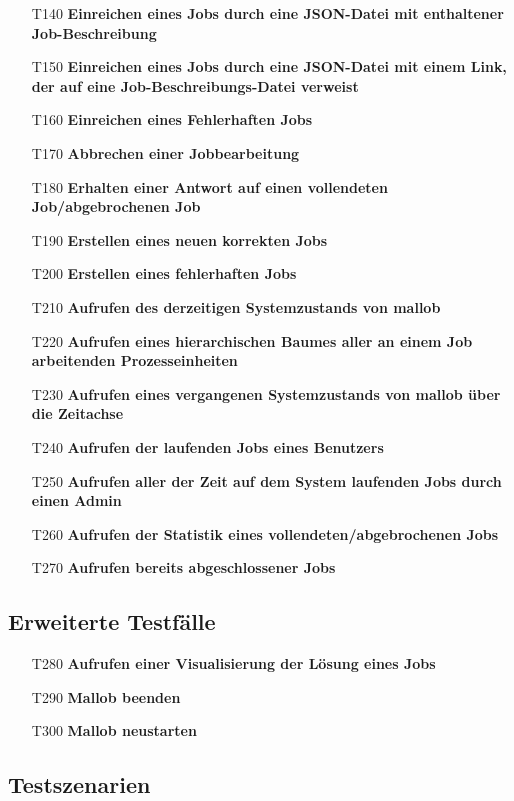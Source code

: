 \begin{itemize}
    \item[T140] \textbf{Einreichen eines Jobs durch eine JSON-Datei mit enthaltener Job-Beschreibung}
    
    \item[T150] \textbf{Einreichen eines Jobs durch eine JSON-Datei mit einem Link, der auf eine Job-Beschreibungs-Datei verweist}
    
    \item[T160] \textbf{Einreichen eines Fehlerhaften Jobs}
    
    \item[T170] \textbf{Abbrechen einer Jobbearbeitung}
    
    \item[T180] \textbf{Erhalten einer Antwort auf einen vollendeten Job/abgebrochenen Job}
    
    \item[T190] \textbf{Erstellen eines neuen korrekten Jobs}
    
    \item[T200] \textbf{Erstellen eines fehlerhaften Jobs}
    
    \item[T210] \textbf{Aufrufen des derzeitigen Systemzustands von mallob}
    
    \item[T220] \textbf{Aufrufen eines hierarchischen Baumes aller an einem Job arbeitenden Prozesseinheiten}
    
    \item[T230] \textbf{Aufrufen eines vergangenen Systemzustands von mallob über die Zeitachse}
    
    \item[T240] \textbf{Aufrufen der laufenden Jobs eines Benutzers}
    
    \item[T250] \textbf{Aufrufen aller der Zeit auf dem System laufenden Jobs durch einen Admin}
    
    \item[T260] \textbf{Aufrufen der Statistik eines vollendeten/abgebrochenen Jobs}
    
    \item[T270] \textbf{Aufrufen bereits abgeschlossener Jobs}
\end{itemize}

\subsection{Erweiterte Testfälle}

\begin{itemize}
    \item[T280] \textbf{Aufrufen einer Visualisierung der Lösung eines Jobs}
    
    \item[T290] \textbf{Mallob beenden}
    
    \item[T300] \textbf{Mallob neustarten}
\end{itemize}

\subsection{Testszenarien}



	
